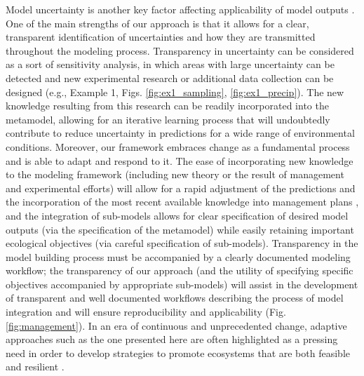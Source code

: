 \documentclass[11pt]{article}
\begin{document}
Model uncertainty is another key factor affecting applicability of model outputs \citep{Addison2013}.
One of the main strengths of our approach is that it allows for a clear, transparent identification of uncertainties and how they are transmitted throughout the modeling process. 
Transparency in uncertainty can be considered as a sort of sensitivity analysis, in which areas with large uncertainty can be detected and new experimental research or additional data collection can be designed (e.g., Example 1, Figs. \ref{fig:ex1_sampling}, \ref{fig:ex1_precip}).
The new knowledge resulting from this research can be readily incorporated into the metamodel, allowing for an iterative learning process that will undoubtedly contribute to reduce uncertainty in predictions for a wide range of environmental conditions. 
Moreover, our framework embraces change as a fundamental process and is able to adapt and respond to it. 
The ease of incorporating new knowledge to the modeling framework (including new theory or the result of management and experimental efforts) will allow for a rapid adjustment of the predictions and the incorporation of the most recent available knowledge into management plans \citep{Keith2011}, and the integration of sub-models allows for clear specification of desired model outputs (via the specification of the metamodel) while easily retaining important ecological objectives (via careful specification of sub-models).
Transparency in the model building process must be accompanied by a clearly documented modeling workflow; the transparency of our approach (and the utility of specifying specific objectives accompanied by appropriate sub-models) will assist in the development of transparent and well documented workflows describing the process of model integration and will ensure reproducibility and applicability (Fig. \ref{fig:management}). 
In an era of continuous and unprecedented change, adaptive approaches such as the one presented here are often highlighted as a pressing need in order to develop strategies to promote ecosystems that are both feasible and resilient \citep{Seastedt2008, Mori2013}.
\end{document}

